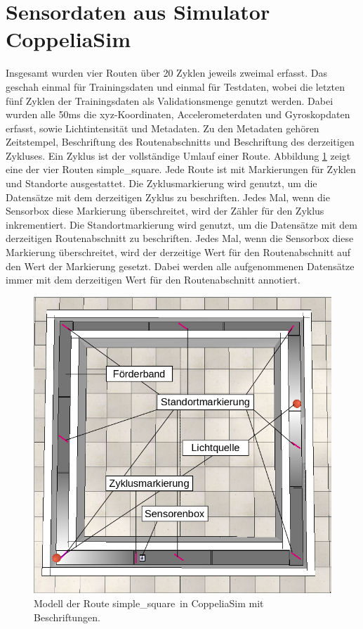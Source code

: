 \section{Sensordaten aus Simulator CoppeliaSim}
Insgesamt wurden vier Routen über 20 Zyklen jeweils zweimal erfasst.
Das geschah einmal für Trainingsdaten und einmal für Testdaten, wobei die letzten fünf Zyklen der
Trainingsdaten als Validationsmenge genutzt werden.
Dabei wurden alle 50ms die xyz-Koordinaten, Accelerometerdaten und Gyroskopdaten erfasst, sowie Lichtintensität und Metadaten.
Zu den Metadaten gehören Zeitstempel, Beschriftung des Routenabschnitts und Beschriftung des derzeitigen Zykluses.
Ein Zyklus ist der vollständige Umlauf einer Route.
\newline
\newline
Abbildung \ref{fig:simple_square_labeled} zeigt eine der vier Routen \glqq simple\_square\grqq.
Jede Route ist mit Markierungen für Zyklen und Standorte ausgestattet.
Die Zyklusmarkierung wird genutzt, um die Datensätze mit dem derzeitigen Zyklus zu beschriften.
Jedes Mal, wenn die Sensorbox diese Markierung überschreitet, wird der Zähler für den Zyklus inkrementiert.
\newpage
Die Standortmarkierung wird genutzt, um die Datensätze mit dem derzeitigen Routenabschnitt zu beschriften.
Jedes Mal, wenn die Sensorbox diese Markierung überschreitet, wird der derzeitige Wert für den Routenabschnitt auf den Wert der Markierung gesetzt.
Dabei werden alle aufgenommenen Datensätze immer mit dem derzeitigen Wert für den Routenabschnitt annotiert.
\begin{figure}[h!]
    \centering
    \includegraphics[width=0.75\linewidth]{images/simple_square_labeled.png}
    \caption{Modell der Route \glqq simple\_square\grqq\ in CoppeliaSim mit Beschriftungen.}
    \label{fig:simple_square_labeled}
\end{figure}
